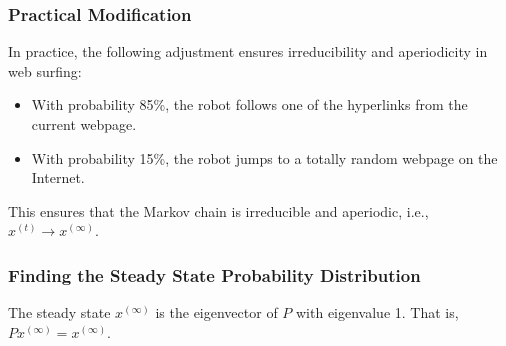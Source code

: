 \subsubsection{Practical Modification}
\begin{intuition}
    In practice, the following adjustment ensures irreducibility and aperiodicity in web surfing:
    \begin{itemize}
        \item With probability 85\%, the robot follows one of the hyperlinks from the current webpage.
        \item With probability 15\%, the robot jumps to a totally random webpage on the Internet.
    \end{itemize}

This ensures that the Markov chain is irreducible and aperiodic, i.e., $x^{(t)} \to x^{(\infty)}$.
\end{intuition}

\subsubsection{Finding the Steady State Probability Distribution}
\begin{definition}
    The steady state $x^{(\infty)}$ is the eigenvector of $P$ with eigenvalue 1. That is, $P x^{(\infty)} = x^{(\infty)}$. 
\end{definition}

